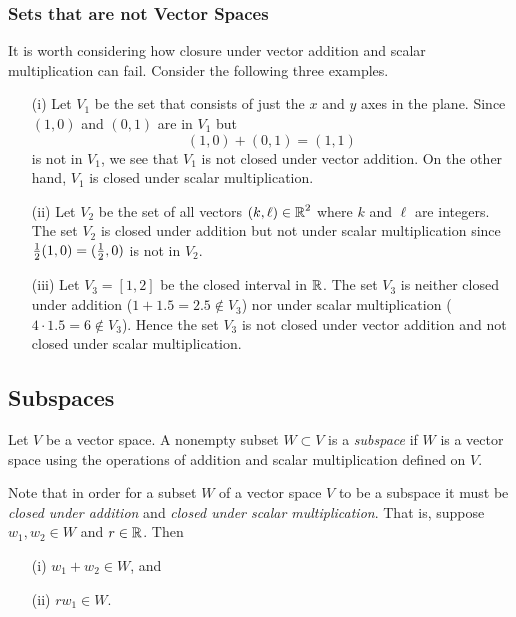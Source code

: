 \documentclass{ximera}
\begin{document}
\subsubsection*{Sets that are not Vector Spaces}

It is worth considering how closure under vector addition and
scalar multiplication can fail.  Consider the following three
examples.

\begin{enumerate}
\item[(i)] Let $V_1$ be the set that consists of just the $x$
and $y$ axes in the plane.  Since $(1,0)$ and $(0,1)$ are in
$V_1$ but
\[
(1,0) + (0,1) = (1,1)
\]
is not in $V_1$, we see that $V_1$ is not closed under vector
addition. On the other hand, $V_1$ is closed under scalar
multiplication.  


\item[(ii)] Let $V_2$ be the set of all vectors $(k,\ell)\in\mbox{$\Bbb{R}$}^2$
where $k$ and $\ell$ are integers.  The set $V_2$ is closed under
addition but not under scalar multiplication since
$\mbox{$\frac{1}{2}$}(1,0)=(\mbox{$\frac{1}{2}$},0)$ is not in $V_2$.

\item[(iii)] Let $V_3=[1,2]$ be the closed interval in $\mbox{$\Bbb{R}$}$. The
set $V_3$ is neither closed under addition ($1+1.5=2.5\not\in
V_3$) nor under scalar multiplication ($4\cdot 1.5 = 6\not\in
V_3$).  Hence the set $V_3$ is not closed under vector addition
and not closed under scalar multiplication.
\end{enumerate}

\subsection*{Subspaces}

\begin{definition} \label{subspaces}
Let $V$ be a vector space.  A nonempty subset $W\subset V$ is a
{\em subspace\/} if $W$ is a vector space using the operations of 
addition and scalar multiplication defined on $V$.
\end{definition} 

Note that in order for a subset $W$ of a vector space $V$ to be a 
subspace it must be {\em closed under addition\/} and {\em closed under
scalar multiplication\/}.  That is, suppose $w_1,w_2\in W$ and 
$r\in\mbox{$\Bbb{R}$}$.  Then
\begin{itemize}
\item[(i)]  $w_1+w_2 \in W$, and
\item[(ii)]  $rw_1\in W$.
\end{itemize}
 
\end{document}
